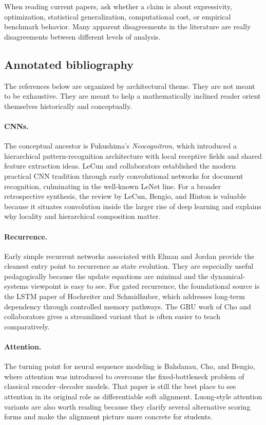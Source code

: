 \begin{remark}
When reading current papers, ask whether a claim is about expressivity, optimization, statistical generalization, computational cost, or empirical benchmark behavior.
Many apparent disagreements in the literature are really disagreements between different levels of analysis.
\end{remark}

\subsection*{Annotated bibliography}

The references below are organized by architectural theme.
They are not meant to be exhaustive.
They are meant to help a mathematically inclined reader orient themselves historically and conceptually.

\paragraph{CNNs.}
The conceptual ancestor is Fukushima's \emph{Neocognitron}, which introduced a hierarchical pattern-recognition architecture with local receptive fields and shared feature extraction ideas.
LeCun and collaborators established the modern practical CNN tradition through early convolutional networks for document recognition, culminating in the well-known LeNet line.
For a broader retrospective synthesis, the review by LeCun, Bengio, and Hinton is valuable because it situates convolution inside the larger rise of deep learning and explains why locality and hierarchical composition matter.

\paragraph{Recurrence.}
Early simple recurrent networks associated with Elman and Jordan provide the cleanest entry point to recurrence as state evolution.
They are especially useful pedagogically because the update equations are minimal and the dynamical-systems viewpoint is easy to see.
For gated recurrence, the foundational source is the LSTM paper of Hochreiter and Schmidhuber, which addresses long-term dependency through controlled memory pathways.
The GRU work of Cho and collaborators gives a streamlined variant that is often easier to teach comparatively.

\paragraph{Attention.}
The turning point for neural sequence modeling is Bahdanau, Cho, and Bengio, where attention was introduced to overcome the fixed-bottleneck problem of classical encoder--decoder models.
That paper is still the best place to see attention in its original role as differentiable soft alignment.
Luong-style attention variants are also worth reading because they clarify several alternative scoring forms and make the alignment picture more concrete for students.

